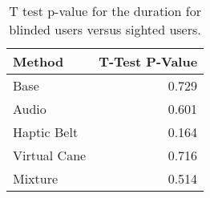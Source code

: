 
\begin{table}[!htb]
\centering
\caption{T test p-value for the duration for blinded users versus sighted users.}
\label{tab:ttest_duration}
\begin{tabular}{lr}
\toprule
      Method &  T-Test P-Value \\
\midrule
        Base &           0.729 \\
       Audio &           0.601 \\
 Haptic Belt &           0.164 \\
Virtual Cane &           0.716 \\
     Mixture &           0.514 \\
\bottomrule
\end{tabular}
\end{table}

